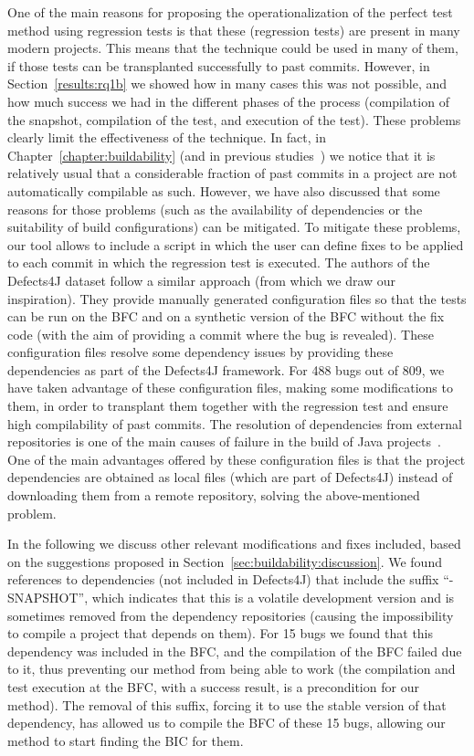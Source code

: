 One of the main reasons for proposing the operationalization of the perfect test method using regression tests is that these (regression tests) are present in many modern projects. This means that the technique could be used in many of them, if those tests can be transplanted successfully to past commits. However, in Section~\ref{results:rq1b} we showed how in many cases this was not possible, and how much success we had in the different phases of the process (compilation of the snapshot, compilation of the test, and execution of the test). These problems clearly limit the effectiveness of the technique.
In fact, in Chapter~\ref{chapter:buildability} (and in previous studies~\cite{tufano2017there}) we notice that it is relatively usual that a considerable fraction of past commits in a project are not automatically compilable as such. 
However, we have also discussed that some reasons for those problems (such as the availability of dependencies or the suitability of build configurations) can be mitigated. 
To mitigate these problems, our tool allows to include a script in which the user can define fixes to be applied to each commit in which the regression test is executed. 
The authors of the Defects4J dataset follow a similar approach (from which we draw our inspiration). 
They provide manually generated configuration files so that the tests can be run on the BFC and on a synthetic version of the BFC without the fix code (with the aim of providing a commit where the bug is revealed).
These configuration files resolve some dependency issues by providing these dependencies as part of the Defects4J framework.
For 488 bugs out of 809, we have taken advantage of these configuration files, making some modifications to them, in order to transplant them together with the regression test and ensure high compilability of past commits.
The resolution of dependencies from external repositories is one of the main causes of failure in the build of Java projects~\cite{tufano2017there}.
One of the main advantages offered by these configuration files is that the project dependencies are obtained as local files (which are part of Defects4J) instead of downloading them from a remote repository, solving the above-mentioned problem.

In the following we discuss other relevant modifications and fixes included, based on the suggestions proposed in Section~\ref{sec:buildability:discussion}.
We found references to dependencies (not included in Defects4J) that include the suffix ``-SNAPSHOT'', which indicates that this is a volatile development version and is sometimes removed from the dependency repositories (causing the impossibility to compile a project that depends on them). 
For 15 bugs we found that this dependency was included in the BFC, and the compilation of the BFC failed due to it, thus preventing our method from being able to work (the compilation and test execution at the BFC, with a success result, is a precondition for our method). 
The removal of this suffix, forcing it to use the stable version of that dependency, has allowed us to compile the BFC of these 15 bugs, allowing our method to start finding the BIC for them.

